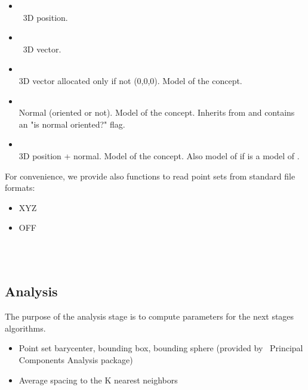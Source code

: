 \begin{itemize}
\item {} \\
\cgal\ 3D position.
\item {} \\
\cgal\ 3D vector.
\item {} \\
3D vector allocated only if not (0,0,0).
Model of the  concept.
\item {} \\
Normal (oriented or not).
Model of the  concept.
Inherits from  and contains an "is normal oriented?" flag.
\item {} \\
3D position + normal.
Model of the  concept.
Also model of  if  is a model of .
\end{itemize}

For convenience, we provide also functions to read point sets from standard file formats:

\begin{itemize}
\item XYZ
\item OFF
\end{itemize}

  \\
  \\


\subsection{Analysis}

The purpose of the analysis stage is to compute parameters for the next stages algorithms.

\begin{itemize}
\item Point set barycenter, bounding box, bounding sphere (provided by \cgal\ Principal Components Analysis package)
\item Average spacing to the K nearest neighbors
\end{itemize}


